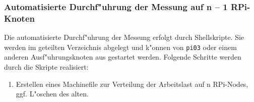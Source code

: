 \subsubsection{Automatisierte Durchf"uhrung der Messung auf n -- 1 RPi-Knoten} 

Die automatisierte Durchf"uhrung der Messung erfolgt durch Shellskripte. Sie werden im geteilten Verzeichnis abgelegt und k"onnen von \texttt{pi03} oder einem anderen Ausf"uhrungsknoten aus gestartet werden. Folgende Schritte werden durch die Skripte realisiert: 

\begin{enumerate}\bfseries
	\item Erstellen eines Machinefile zur Verteilung der Arbeitslast auf n RPi-Nodes, ggf. L"oschen des alten.\\
\end{enumerate}
